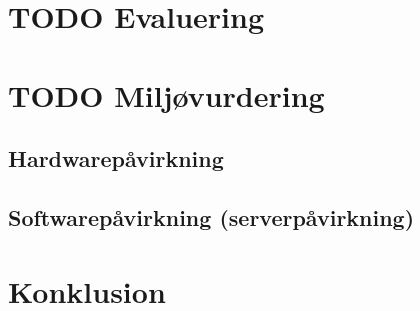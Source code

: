 \documentclass[11pt]{article}
\begin{document}
\section{{\bfseries\sffamily TODO} Evaluering}
\label{sec:org6ac19ad}
\section{{\bfseries\sffamily TODO} Miljøvurdering}
\label{sec:org0117987}
\subsection{Hardwarepåvirkning}
\label{sec:org46efe07}
\subsection{Softwarepåvirkning (serverpåvirkning)}
\label{sec:orgf0c9e32}
\section{Konklusion}
\label{sec:org8d5fd2b}
\end{document}
